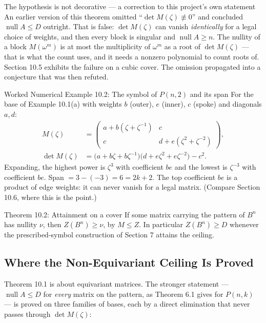 \documentclass[11pt]{article}
\begin{document}
\begin{callbox}{The hypothesis is not decorative --- a correction to this project's own statement}
An earlier version of this theorem omitted ``$\det M(\zeta)\not\equiv0$'' and concluded $\operatorname{null}A\le D$ outright. That is false: $\det M(\zeta)$ can vanish \emph{identically} for a legal choice of weights, and then every block is singular and $\operatorname{null}A\ge n$. The nullity of a block $M(\omega^m)$ is at most the multiplicity of $\omega^m$ as a root of $\det M(\zeta)$ --- that is what the count uses, and it needs a nonzero polynomial to count roots of. Section 10.5 exhibits the failure on a cubic cover. The omission propagated into a conjecture that was then refuted.
\end{callbox}

\begin{callbox}{Worked Numerical Example 10.2: The symbol of $P(n,2)$ and its span}
For the base of Example 10.1(a) with weights $b$ (outer), $e$ (inner), $c$ (spoke) and diagonals $a,d$:
\begin{align}
  M(\zeta)&=\begin{pmatrix} a+b(\zeta+\zeta^{-1}) & c\\ c & d+e(\zeta^{2}+\zeta^{-2})\end{pmatrix},\\
  \det M(\zeta)&=\bigl(a+b\zeta+b\zeta^{-1}\bigr)\bigl(d+e\zeta^{2}+e\zeta^{-2}\bigr)-c^{2}.
\end{align}
Expanding, the highest power is $\zeta^{3}$ with coefficient $be$ and the lowest is $\zeta^{-3}$ with coefficient $be$. Span $=3-(-3)=6=2k+2$. The top coefficient $be$ is a product of edge weights: it can never vanish for a legal matrix. (Compare Section 10.6, where this is the point.)
\end{callbox}

\begin{thmbox}{Theorem 10.2: Attainment on a cover}
If some matrix carrying the pattern of $B^n$ has nullity $\nu$, then $Z(B^n)\ge\nu$, by $M\le Z$. In particular $Z(B^n)\ge D$ whenever the prescribed-symbol construction of Section 7 attains the ceiling.
\end{thmbox}

\subsection{Where the Non-Equivariant Ceiling Is Proved}

Theorem 10.1 is about equivariant matrices. The stronger statement --- $\operatorname{null}A\le D$ for \emph{every} matrix on the pattern, as Theorem 6.1 gives for $P(n,k)$ --- is proved on three families of bases, each by a direct elimination that never passes through $\det M(\zeta)$:
\end{document}
